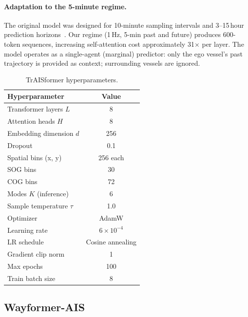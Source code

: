 \documentclass[12pt, a4paper]{article}
\begin{document}
\paragraph{Adaptation to the 5-minute regime.}
The original model was designed for 10-minute sampling intervals and
3--15\,hour prediction horizons~\citep{nguyen2021traisformer}.
Our regime (1\,Hz, 5-min past and future) produces 600-token sequences,
increasing self-attention cost approximately 31$\times$ per layer.
The model operates as a single-agent (marginal) predictor: only the ego
vessel's past trajectory is provided as context; surrounding vessels are
ignored.

\begin{table}[H]
  \centering
  \caption{TrAISformer hyperparameters.}
  \label{tab:traisformer_hp}
  \begin{tabular}{lc}
    \toprule
    \textbf{Hyperparameter} & \textbf{Value} \\
    \midrule
    Transformer layers $L$         & 8 \\
    Attention heads $H$            & 8 \\
    Embedding dimension $d$        & 256 \\
    Dropout                        & 0.1 \\
    Spatial bins (x, y)            & 256 each \\
    SOG bins                       & 30 \\
    COG bins                       & 72 \\
    Modes $K$ (inference)          & 6 \\
    Sample temperature $\tau$      & 1.0 \\
    Optimizer                      & AdamW \\
    Learning rate                  & $6 \times 10^{-4}$ \\
    LR schedule                    & Cosine annealing \\
    Gradient clip norm             & 1 \\
    Max epochs                     & 100 \\
    Train batch size               & 8 \\
    \bottomrule
  \end{tabular}
\end{table}

\subsection{Wayformer-AIS}
\label{sec:wayformer}
\end{document}

